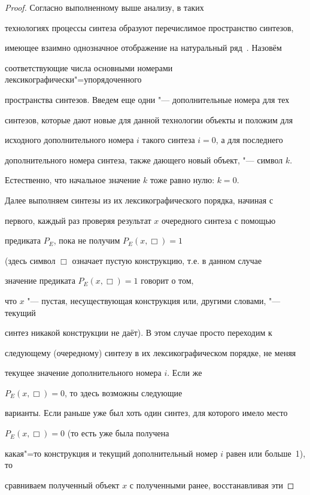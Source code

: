 \begin{proof} Согласно выполненному выше анализу, в таких

технологиях процессы синтеза образуют перечислимое пространство синтезов,

имеющее взаимно однозначное отображение на натуральный ряд~\cite{krylov:bib12}. Назовём

соответствующие числа основными номерами лексикографически"=упорядоченного

пространства синтезов. Введем еще одни "--- дополнительные номера для тех

синтезов, которые дают новые для данной технологии объекты и положим для

исходного дополнительного номера $i$ такого синтеза $i=0$, а для последнего

дополнительного номера синтеза, также дающего новый объект, "--- символ $k$.

Естественно, что начальное значение $k$ тоже равно нулю: $k= 0$.



Далее выполняем синтезы из их лексикографического порядка, начиная с

первого, каждый раз проверяя результат $x$ очередного синтеза с помощью

предиката $P_{E}$, пока не получим $P_{E}(x, \Box)=1$

(здесь символ $\Box$ означает пустую конструкцию, т.е. в данном случае

значение предиката $P_{E}(x, \Box)=1$ говорит о том,

что $x $ "--- пустая, несуществующая конструкция или, другими словами, "--- текущий

синтез никакой конструкции не даёт). В этом случае просто переходим к

следующему (очередному) синтезу в их лексикографическом порядке, не меняя

текущее значение дополнительного номера $i$. Если же

${P_{E}(x, \Box)=0}$, то здесь возможны следующие

варианты. Если раньше уже был хоть один синтез, для которого имело место

$P_{E}(x, \Box)=0$ (то есть уже была получена

какая"=то конструкция и текущий дополнительный номер $i$ равен или больше~1), то

сравниваем полученный объект $x$ с полученными ранее, восстанавливая эти


\end{proof}
